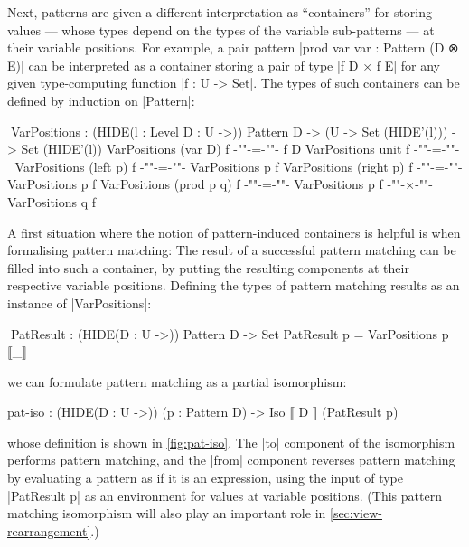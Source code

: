 \documentclass{sigplanconf}
\begin{document}
Next, patterns are given a different interpretation as ``containers'' for storing values --- whose types depend on the types of the variable sub-patterns --- at their variable positions.
For example, a pair pattern |prod var var : Pattern (D ⊗ E)| can be interpreted as a container storing a pair of type |f D × f E| for any given type-computing function |f : U -> Set|.
The types of such containers can be defined by induction on |Pattern|:
\begin{code}
^^^VarPositions :
  (HIDE({l : Level} {D : U} ->)) Pattern D -> (U -> Set (HIDE'(l))) -> Set (HIDE'(l))
VarPositions (var {D})   f {-"\kern-1pt"-}={-"\kern-1pt"-} f D
VarPositions unit        f {-"\kern-1pt"-}={-"\kern-1pt"-} ⊤
VarPositions (left   p)  f {-"\kern-1pt"-}={-"\kern-1pt"-} VarPositions p f
VarPositions (right  p)  f {-"\kern-1pt"-}={-"\kern-1pt"-} VarPositions p f
VarPositions (prod p q)  f {-"\kern-1pt"-}={-"\kern-1pt"-} VarPositions p f {-"\kern-1pt"-}×{-"\kern-1pt"-} VarPositions q f
\end{code}
A first situation where the notion of pattern-induced containers is helpful is when formalising pattern matching:
The result of a successful pattern matching can be filled into such a container, by putting the resulting components at their respective variable positions.
Defining the types of pattern matching results as an instance of |VarPositions|:
\begin{code}
^^^PatResult : (HIDE({D : U} ->)) Pattern D -> Set
PatResult p = VarPositions p ⟦_⟧
\end{code}
we can formulate pattern matching as a partial isomorphism:
\begin{code}
pat-iso : (HIDE({D : U} ->)) (p : Pattern D) -> Iso ⟦ D ⟧ (PatResult p)
\end{code}
whose definition is shown in \autoref{fig:pat-iso}.
The |to| component of the isomorphism performs pattern matching, and the |from| component reverses pattern matching by evaluating a pattern as if it is an expression, using the input of type |PatResult p| as an environment for values at variable positions.
(This pattern matching isomorphism will also play an important role in \autoref{sec:view-rearrangement}.)
\end{document}
